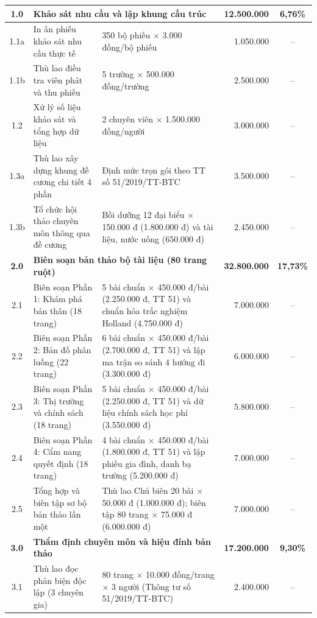 \begin{center}
{\begin{longtable}{|c|p{4.5cm}|p{5.5cm}|r|c|}
\textbf{1.0} & \multicolumn{2}{l|}{\textbf{Khảo sát nhu cầu và lập khung cấu trúc}} & \textbf{12.500.000} & \textbf{6,76\%} \\
\hline
1.1a & In ấn phiếu khảo sát nhu cầu thực tế & 350 bộ phiếu $\times$ 3.000 đồng/bộ phiếu & 1.050.000 & -- \\
\hline
1.1b & Thù lao điều tra viên phát và thu phiếu & 5 trường $\times$ 500.000 đồng/trường & 2.500.000 & -- \\
\hline
1.2 & Xử lý số liệu khảo sát và tổng hợp dữ liệu & 2 chuyên viên $\times$ 1.500.000 đồng/người & 3.000.000 & -- \\
\hline
1.3a & Thù lao xây dựng khung đề cương chi tiết 4 phần & Định mức trọn gói theo TT số 51/2019/TT-BTC & 3.500.000 & -- \\
\hline
1.3b & Tổ chức hội thảo chuyên môn thông qua đề cương & Bồi dưỡng 12 đại biểu $\times$ 150.000 đ (1.800.000 đ) và tài liệu, nước uống (650.000 đ) & 2.450.000 & -- \\
\hline
\textbf{2.0} & \multicolumn{2}{l|}{\textbf{Biên soạn bản thảo bộ tài liệu (80 trang ruột)}} & \textbf{32.800.000} & \textbf{17,73\%} \\
\hline
2.1 & Biên soạn Phần 1: Khám phá bản thân (18 trang) & 5 bài chuẩn $\times$ 450.000 đ/bài (2.250.000 đ, TT 51) và chuẩn hóa trắc nghiệm Holland (4.750.000 đ) & 7.000.000 & -- \\
\hline
2.2 & Biên soạn Phần 2: Bản đồ phân luồng (22 trang) & 6 bài chuẩn $\times$ 450.000 đ/bài (2.700.000 đ, TT 51) và lập ma trận so sánh 4 hướng đi (3.300.000 đ) & 6.000.000 & -- \\
\hline
2.3 & Biên soạn Phần 3: Thị trường và chính sách (18 trang) & 5 bài chuẩn $\times$ 450.000 đ/bài (2.250.000 đ, TT 51) và dữ liệu chính sách học phí (3.550.000 đ) & 5.800.000 & -- \\
\hline
2.4 & Biên soạn Phần 4: Cẩm nang quyết định (18 trang) & 4 bài chuẩn $\times$ 450.000 đ/bài (1.800.000 đ, TT 51) và lập phiếu gia đình, danh bạ trường (5.200.000 đ) & 7.000.000 & -- \\
\hline
2.5 & Tổng hợp và biên tập sơ bộ bản thảo lần một & Thù lao Chủ biên 20 bài $\times$ 50.000 đ (1.000.000 đ); biên tập 80 trang $\times$ 75.000 đ (6.000.000 đ) & 7.000.000 & -- \\
\hline
\textbf{3.0} & \multicolumn{2}{l|}{\textbf{Thẩm định chuyên môn và hiệu đính bản thảo}} & \textbf{17.200.000} & \textbf{9,30\%} \\
\hline
3.1 & Thù lao đọc phản biện độc lập (3 chuyên gia) & 80 trang $\times$ 10.000 đồng/trang $\times$ 3 người (Thông tư số 51/2019/TT-BTC) & 2.400.000 & -- \\

\end{longtable}}
\end{center}
